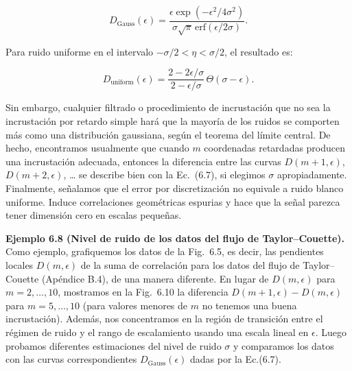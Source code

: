 \documentclass[10pt,a4paper]{book}
\begin{document}
\begin{equation}
D_\text{Gauss}(\epsilon) = \frac{\epsilon \exp(-\epsilon^2/4\sigma^2)}{\sigma \sqrt{\pi} \, \text{erf}(\epsilon/2\sigma)}.
\end{equation}

Para ruido uniforme en el intervalo $-\sigma/2 < \eta < \sigma/2$, el resultado es:

\begin{equation}
D_\text{uniform}(\epsilon) = \frac{2 - 2\epsilon/\sigma}{2 - \epsilon/\sigma} \, \Theta(\sigma - \epsilon).
\end{equation}

Sin embargo, cualquier filtrado o procedimiento de incrustación que no sea la incrustación por retardo simple hará que la mayoría de los ruidos se comporten más como una distribución gaussiana, según el teorema del límite central. De hecho, encontramos usualmente que cuando $m$ coordenadas retardadas producen una incrustación adecuada, entonces la diferencia entre las curvas $D(m+1, \epsilon)$, $D(m+2, \epsilon)$, \dots{} se describe bien con la Ec.~(6.7), si elegimos $\sigma$ apropiadamente. Finalmente, señalamos que el error por discretización no equivale a ruido blanco uniforme. Induce correlaciones geométricas espurias y hace que la señal parezca tener dimensión cero en escalas pequeñas.

\newpage

\textbf{Ejemplo 6.8 (Nivel de ruido de los datos del flujo de Taylor–Couette).} Como ejemplo, grafiquemos los datos de la Fig.~6.5, es decir, las pendientes locales $D(m, \epsilon)$ de la suma de correlación para los datos del flujo de Taylor–Couette (Apéndice B.4), de una manera diferente. En lugar de $D(m, \epsilon)$ para $m = 2, \dots, 10$, mostramos en la Fig.~6.10 la diferencia $D(m+1, \epsilon) - D(m, \epsilon)$ para $m = 5, \ldots, 10$ (para valores menores de $m$ no tenemos una buena incrustación). Además, nos concentramos en la región de transición entre el régimen de ruido y el rango de escalamiento usando una escala lineal en $\epsilon$. Luego probamos diferentes estimaciones del nivel de ruido $\sigma$ y comparamos los datos con las curvas correspondientes $D_{\text{Gauss}}(\epsilon)$ dadas por la Ec.(6.7). 

\bigskip
\end{document}
